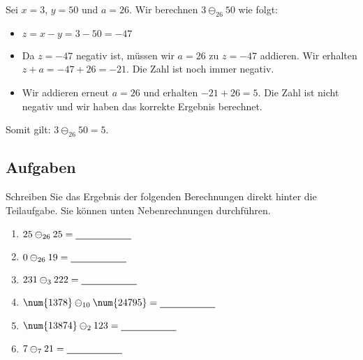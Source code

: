 \begin{example}
Sei $x = 3$, $y = 50$ und $a = 26$. Wir berechnen $3 \ominus_{26} 50$ wie folgt: 
\begin{itemize}
\item $z = x - y = 3 - 50 = -47$
\item Da $z = -47$ negativ ist, müssen wir $a = 26$ zu $z = -47$ addieren. Wir erhalten $z + a = -47 + 26 = -21$. Die Zahl ist noch immer negativ.
\item Wir addieren erneut $a = 26$ und erhalten $-21 + 26 = 5$. Die Zahl ist nicht negativ und wir haben das korrekte Ergebnis berechnet.
\end{itemize}
Somit gilt: $3 \ominus_{26} 50 = 5$.
\end{example}

\subsection{Aufgaben}

Schreiben Sie das Ergebnis der folgenden Berechnungen direkt hinter die Teilaufgabe. Sie können unten Nebenrechnungen durchführen.

\begin{multicols}{2}
\begin{enumerate}
\item $25 \ominus_{26} 25 = \rule[-0.75mm]{2cm}{.5pt}$
\item $0 \ominus_{26} 19 = \rule[-0.75mm]{2cm}{.5pt}$
\item $231 \ominus_{3} 222 = \rule[-0.75mm]{2cm}{.5pt}$
\item $\num{1378} \ominus_{10} \num{24795} = \rule[-0.75mm]{2cm}{.5pt}$
\item $\num{13874} \ominus_{2} 123 = \rule[-0.75mm]{2cm}{.5pt}$
\item $7 \ominus_{7} 21 = \rule[-0.75mm]{2cm}{.5pt}$
\end{enumerate}
\end{multicols}

